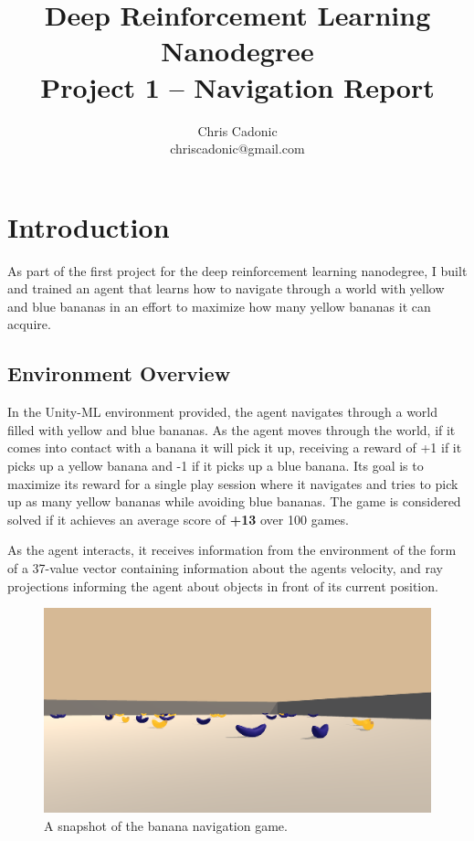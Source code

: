 \documentclass[11pt]{article}
\begin{document}
\title{Deep Reinforcement Learning Nanodegree\\
	   Project 1 -- Navigation Report}
\author{\vspace{-1mm}Chris Cadonic\\
chriscadonic@gmail.com}
\maketitle
\vspace{-1.5em}

\section{Introduction}

As part of the first project for the deep reinforcement learning nanodegree, I built and trained an agent that learns how to navigate through a world with yellow and blue bananas in an effort to maximize how many yellow bananas it can acquire.

\subsection{Environment Overview}

In the Unity-ML environment provided, the agent navigates through a world filled with yellow and blue bananas. As the agent moves through the world, if it comes into contact with a banana it will pick it up, receiving a reward of +1 if it picks up a yellow banana and -1 if it picks up a blue banana. Its goal is to maximize its reward for a single play session where it navigates and tries to pick up as many yellow bananas while avoiding blue bananas. The game is considered solved if it achieves an average score of \textbf{+13} over 100 games.

As the agent interacts, it receives information from the environment of the form of a 37-value vector containing information about the agents velocity, and ray projections informing the agent about objects in front of its current position.


\FloatBarrier

\begin{figure}[!ht]
	\centering
	\includegraphics[width=0.75\linewidth]{images/example-game-image.png}
	\caption{A snapshot of the banana navigation game.}
	\label{fig:example-game-image}
\end{figure}
\end{document}
